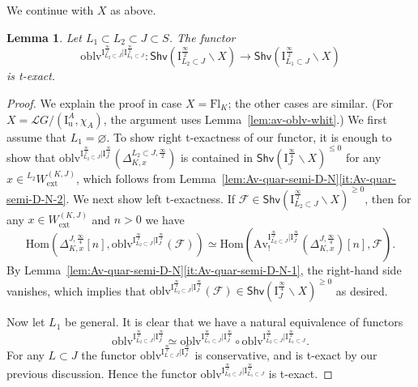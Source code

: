\documentclass[11pt]{amsart}
\numberwithin{equation}{section}
\theoremstyle{plain}
\newtheorem{lem}[thm]{Lemma}
\theoremstyle{definition}
\newcommand{\sF}{{\mathcal F}}
\newcommand{\I}{{\mathrm I}}
\newcommand{\sL}{{\mathcal L}}
\newcommand{\Hom}{\mathrm{Hom}}
\newcommand{\semi}{{{\frac{\infty}{2}}}}
\newcommand{\quar}{{{\frac{\infty}{4}}}}
\newcommand{\oblv}{\mathrm{oblv}}
\newcommand{\Av}{\mathrm{Av}}
\newcommand{\ex}{\mathrm{ext}}
\newcommand{\Shv}{\mathsf{Shv}}
\newcommand{\Fl}{\mathrm{Fl}}
\newcommand{\Iu}{\mathrm{I}_{\mathrm{u}}}
\begin{document}
We continue with $X$ as above.

\begin{lem}
\label{lem:oblv-semi-quar-texact}
Let $L_1\subset L_2\subset J\subset S$. 
The functor 
\[
\oblv^{\I_{L_2 \subset J}^{\semi}|\I_{L_1 \subset J}^{\semi}}:
\Shv\left(\I_{L_2 \subset J}^{\semi}\backslash X\right)\rightarrow \Shv\left(\I_{L_1 \subset J}^{\semi}\backslash X\right)
\]
is t-exact. 
\end{lem}

\begin{proof}
We explain the proof in case $X=\Fl_K$; the other cases are similar. (For $X=\sL G/(\Iu^A,\chi_A)$, the argument uses Lemma~\ref{lem:av-oblv-whit}.)
We first assume that $L_1=\varnothing$. 
To show right t-exactness of our functor, it is enough to show that $\oblv^{\I_{L_2 \subset J}^{\semi}|\I_{J}^{\quar}}(\Delta^{L_2\subset J,\semi}_{K,x})$ is contained in $\Shv\left(\I_{J}^{\quar}\backslash X\right)^{\leq 0}$ for any $x\in {}^{L_2}W_\ex^{(K,J)}$, which follows from Lemma~\ref{lem:Av-quar-semi-D-N}\eqref{it:Av-quar-semi-D-N-2}. 
We next show left t-exactness. If $\sF\in \Shv\left(\I_{L_2 \subset J}^{\semi}\backslash X\right)^{\geq 0}$, then for any $x\in W_\ex^{(K,J)}$ and $n> 0$ we have 
\begin{equation*}
\Hom \left( \Delta^{J,\quar}_{K,x}[n], \oblv^{\I_{L_2 \subset J}^{\semi}|\I_{J}^{\quar}}(\sF) \right) \simeq \Hom \left( \Av_!^{\I_{L_2 \subset J}^{\semi}|\I_{J}^{\quar}}(\Delta^{J,\quar}_{K,x})[n],\sF \right). 
\end{equation*}
By Lemma~\ref{lem:Av-quar-semi-D-N}\eqref{it:Av-quar-semi-D-N-1}, the right-hand side
vanishes, which implies that $\oblv^{\I_{L_2 \subset J}^{\semi}|\I_{J}^{\quar}}(\sF)\in \Shv\left(\I_J^{\quar}\backslash X\right)^{\geq 0}$ as desired.

Now let $L_1$ be general. 
It is clear that we have a natural equivalence of functors 
\[
\oblv^{\I_{L_2 \subset J}^{\semi}|\I_{J}^{\quar}} \simeq 
\oblv^{\I_{L_1 \subset J}^{\semi}|\I_{J}^{\quar}} \circ \oblv^{\I_{L_2 \subset J}^{\semi}|\I_{L_1 \subset J}^{\semi}}. 
\]
For any $L\subset J$ the functor $\oblv^{\I_{L \subset J}^{\semi}|\I_{J}^{\quar}}$ is conservative, and is t-exact by our previous discussion. 
Hence the functor $\oblv^{\I_{L_2 \subset J}^{\semi}|\I_{L_1 \subset J}^{\semi}}$ is t-exact. 
\end{proof}
\end{document}
